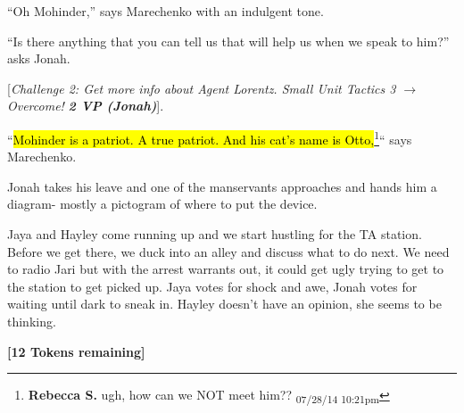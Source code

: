 ``Oh Mohinder,'' says Marechenko with an indulgent tone.

``Is there anything that you can tell us that will help us when we speak to him?'' asks Jonah.

{[}\textit{Challenge 2: Get more info about Agent Lorentz.  Small Unit Tactics 3 $\rightarrow$ Overcome! }\textit{\textbf{2 VP (Jonah)}}{]}.  

``\hl{Mohinder is a patriot.  A true patriot.  And his cat's name is Otto,}\footnote{\textbf{Rebecca S. }ugh, how can we NOT meet him?? \textsubscript{07/28/14 10:21pm}}`` says Marechenko.



Jonah takes his leave and one of the manservants approaches and hands him a diagram- mostly a pictogram of where to put the device.



Jaya and Hayley come running up and we start hustling for the TA station.  Before we get there, we duck into an alley and discuss what to do next.  We need to radio Jari but with the arrest warrants out, it could get ugly trying to get to the station to get picked up.  Jaya votes for shock and awe, Jonah votes for waiting until dark to sneak in.  Hayley doesn't have an opinion, she seems to be thinking.









\textbf{{[}12 Tokens remaining{]}}





